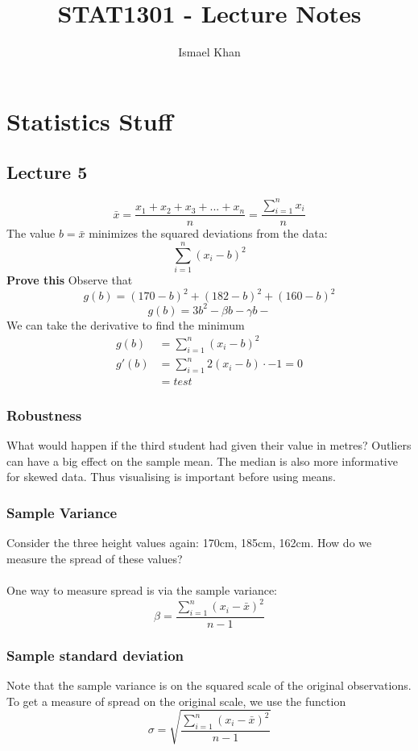 \documentclass{report}
\title{STAT1301 - Lecture Notes}
\author{Ismael Khan}
\date{}
\theoremstyle{definition}
\theoremstyle{plain}
\theoremstyle{remark}
\begin{document}
\maketitle
\noindent
\chapter{Statistics Stuff}
\section{Lecture 5}
$$ \bar{x} = \frac{x_1 + x_2 + x_3 + ... + x_n}{n} = \frac{\displaystyle \sum_{i=1}^n x_i}{n} $$
The value $ b = \bar{x} $ minimizes the squared deviations from the data:
$$ \sum_{i=1}^n (x_i - b)^2 $$
\textbf{Prove this}
Observe that 
$$ g(b) = (170 - b)^2 + (182 - b)^2 + (160 - b)^2 $$
$$ g(b) = 3b^2 - \beta b - \gamma b -  $$
We can take the derivative to find the minimum
\begin{align*}
	g(b) &= \sum_{i=1}^n (x_i - b)^2\\
	g'(b) &= \sum_{i=1}^n 2(x_i -b) \cdot -1 = 0\\
	      &= test
\end{align*}

\subsection{Robustness}
What would happen if the third student had given their value in metres? Outliers can have a big effect on the sample mean. The median is also more informative for skewed data. Thus visualising is important before using means.

\subsection{Sample Variance}
Consider the three height values again: 170cm, 185cm, 162cm. How do we measure
the spread of these values?\\\\
One way to measure spread is via the sample variance:
$$ \beta = \frac{\sum_{i=1}^n (x_i - \bar{x})^2}{n-1} $$

\subsection{Sample standard deviation}
Note that the sample variance is on the squared scale of the original observations. To get a measure of spread on the original scale, we use the function
$$ \sigma = \sqrt{ \frac{\sum_{i=1}^n (x_i - \bar{x})^2}{n-1}} $$
\end{document}
